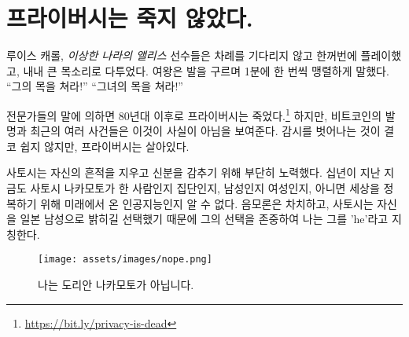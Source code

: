 \chapter{프라이버시는 죽지 않았다.}
\label{les:19}

\begin{chapquote}
	{루이스 캐롤, \textit{이상한 나라의 앨리스}}
	선수들은 차례를 기다리지 않고 한꺼번에 플레이했고, 내내 큰 목소리로 다투었다.
	여왕은 발을 구르며 1분에 한 번씩 맹렬하게 말했다.
	\enquote{그의 목을 쳐라!}
	\enquote{그녀의 목을 쳐라!}
\end{chapquote}

\begin{comment}
	If pundits are to believed, privacy has been dead since the
	80ies\footnote{\url{https://bit.ly/privacy-is-dead}}. The pseudonymous invention
	of Bitcoin and other events in recent history show that this is not the case.
	Privacy is alive, even though it is by no means easy to escape the surveillance
	state.
\end{comment}
전문가들의 말에 의하면 80년대 이후로 프라이버시는 죽었다.\footnote{\url{https://bit.ly/privacy-is-dead}}
하지만, 비트코인의 발명과 최근의 여러 사건들은 이것이 사실이 아님을 보여준다.
감시를 벗어나는 것이 결코 쉽지 않지만, 프라이버시는 살아있다.

\begin{comment}
	Satoshi went through great lengths to cover up his tracks and conceal
	his identity. Ten years later, it is still unknown if Satoshi Nakamoto
	was a single person, a group of people, male, female, or a
	time-traveling AI which bootstrapped itself to take over the world.
	Conspiracy theories aside, Satoshi chose to identify himself to be a
	Japanese male, which is why I don't assume but respect his chosen gender
	and refer to him as \textit{he}.
\end{comment}
사토시는 자신의 흔적을 지우고 신분을 감추기 위해 부단히 노력했다.
십년이 지난 지금도 사토시 나카모토가 한 사람인지 집단인지, 
남성인지 여성인지, 아니면 세상을 정복하기 위해 미래에서 온 인공지능인지 알 수 없다.
음모론은 차치하고, 사토시는 자신을 일본 남성으로 밝히길 선택했기 때문에
그의 선택을 존중하여 나는 그를 'he'라고 지칭한다.
\begin{figure}
	\texttt{[image: assets/images/nope.png]}
	\caption{나는 도리안 나카모토가 아닙니다.}
	\label{fig:nope}
\end{figure}

